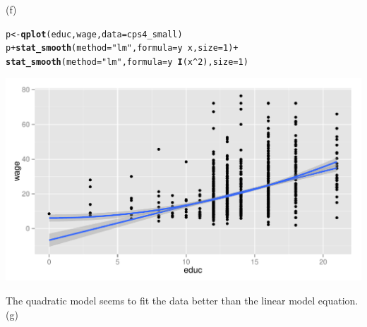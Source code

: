\documentclass[a4paper]{article}\usepackage[]{graphicx}\usepackage[]{color}
\makeatletter
\def\maxwidth{ %
  \ifdim\Gin@nat@width>\linewidth
    \linewidth
  \else
    \Gin@nat@width
  \fi
}
\newcommand{\hlnum}[1]{\textcolor[rgb]{0.686,0.059,0.569}{#1}}%
\newcommand{\hlstr}[1]{\textcolor[rgb]{0.192,0.494,0.8}{#1}}%
\newcommand{\hlopt}[1]{\textcolor[rgb]{0,0,0}{#1}}%
\newcommand{\hlstd}[1]{\textcolor[rgb]{0.345,0.345,0.345}{#1}}%
\newcommand{\hlkwb}[1]{\textcolor[rgb]{0.69,0.353,0.396}{#1}}%
\newcommand{\hlkwc}[1]{\textcolor[rgb]{0.333,0.667,0.333}{#1}}%
\newcommand{\hlkwd}[1]{\textcolor[rgb]{0.737,0.353,0.396}{\textbf{#1}}}%
\newenvironment{kframe}{%
 \def\at@end@of@kframe{}%
 \ifinner\ifhmode%
  \def\at@end@of@kframe{\end{minipage}}%
  \begin{minipage}{\columnwidth}%
 \fi\fi%
 \def\FrameCommand##1{\hskip\@totalleftmargin \hskip-\fboxsep
 \colorbox{shadecolor}{##1}\hskip-\fboxsep
     \hskip-\linewidth \hskip-\@totalleftmargin \hskip\columnwidth}%
 \MakeFramed {\advance\hsize-\width
   \@totalleftmargin\z@ \linewidth\hsize
   \@setminipage}}%
 {\par\unskip\endMakeFramed%
 \at@end@of@kframe}
\newenvironment{knitrout}{}{} %
\makeatother
\begin{document}
(f)

\begin{knitrout}
\color{fgcolor}\begin{kframe}
\begin{alltt}
\hlstd{p} \hlkwb{<-} \hlkwd{qplot}\hlstd{(educ, wage,} \hlkwc{data} \hlstd{= cps4_small)}
\hlstd{p} \hlopt{+} \hlkwd{stat_smooth}\hlstd{(}\hlkwc{method} \hlstd{=} \hlstr{"lm"}\hlstd{,} \hlkwc{formula} \hlstd{= y} \hlopt{~} \hlstd{x,} \hlkwc{size} \hlstd{=} \hlnum{1}\hlstd{)} \hlopt{+}
\hlkwd{stat_smooth}\hlstd{(}\hlkwc{method} \hlstd{=} \hlstr{"lm"}\hlstd{,} \hlkwc{formula} \hlstd{= y} \hlopt{~} \hlkwd{I}\hlstd{(x}\hlopt{^}\hlnum{2}\hlstd{),} \hlkwc{size} \hlstd{=} \hlnum{1}\hlstd{)}
\end{alltt}
\end{kframe}
\includegraphics[width=\maxwidth]{figure/unnamed-chunk-7-1} 

\end{knitrout}

The quadratic model seems to fit the data better than the linear model equation.\\

(g)
\end{document}
